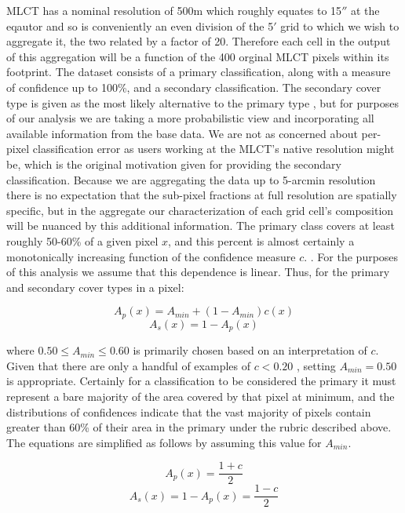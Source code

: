 MLCT has a nominal resolution of 500m which roughly equates to 15$''$
at the eqautor and so is conveniently an even division of the 5$'$
grid to which we wish to aggregate it, the two related by a factor of
20.  Therefore each cell in the output of this aggregation will be a
function of the 400 orginal MLCT pixels within its footprint.  The
dataset consists of a primary classification, along with a measure of
confidence up to 100\%, and a secondary classification.  The secondary
cover type is given as the most likely alternative to the primary type
\citep{Friedl2010}, but for purposes of our analysis we are taking a
more probabilistic view and incorporating all available information
from the base data.  We are not as concerned about per-pixel
classification error as users working at the MLCT's native resolution
might be, which is the original motivation given for providing the
secondary classification.  Because we are aggregating the data up to
5-arcmin resolution there is no expectation that the sub-pixel
fractions at full resolution are spatially specific, but in the
aggregate our characterization of each grid cell's composition will be
nuanced by this additional information.  The primary class covers at
least roughly 50-60\% of a given pixel $x$, and this percent is almost
certainly a monotonically increasing function of the confidence
measure $c$.  .  For the purposes of this
analysis we assume that this dependence is linear. Thus, for the
primary and secondary cover types in a pixel:

$$
A_p(x) = A_{min} + (1 - A_{min}) c(x)
$$
$$
A_s(x) = 1 - A_p(x)
$$

where $0.50 \le A_{min} \le 0.60$ is primarily chosen based on an
interpretation of $c$.  Given that there are only a handful of
examples of $c < 0.20$ , setting $A_{min} = 0.50$ is appropriate.
Certainly for a classification to be considered the primary it must
represent a bare majority of the area covered by that pixel at
minimum, and the distributions of confidences indicate that the vast
majority of pixels contain greater than 60\% of their area in the
primary under the rubric described above.  The equations are simplified
as follows by assuming this value for $A_{min}$.

$$
A_p(x) = \dfrac{1 + c}{2}
$$
$$
A_s(x) = 1 - A_p(x) = \dfrac{1-c}{2}
$$




